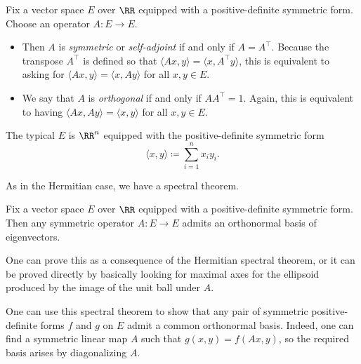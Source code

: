 \documentclass[../notes.tex]{subfiles}
\begin{document}
\begin{definition}[symmetric]
	Fix a vector space $E$ over $\RR$ equipped with a positive-definite symmetric form. Choose an operator $A\colon E\to E$.
	\begin{itemize}
		\item Then $A$ is \textit{symmetric} or \textit{self-adjoint} if and only if $A=A^\intercal$. Because the transpose $A^\intercal$ is defined so that $\langle Ax,y\rangle=\langle x,A^\intercal y\rangle$, this is equivalent to asking for $\langle Ax,y\rangle=\langle x,Ay\rangle$ for all $x,y\in E$.
		\item  We say that $A$ is \textit{orthogonal} if and only if $AA^\intercal=1$. Again, this is equivalent to having $\langle Ax,Ay\rangle=\langle x,y\rangle$ for all $x,y\in E$.
	\end{itemize}
\end{definition}
\begin{example}
	The typical $E$ is $\RR^n$ equipped with the positive-definite symmetric form
	\[\langle x,y\rangle\coloneqq\sum_{i=1}^nx_iy_i.\]
\end{example}
As in the Hermitian case, we have a spectral theorem.
\begin{theorem}
	Fix a vector space $E$ over $\RR$ equipped with a positive-definite symmetric form. Then any symmetric operator $A\colon E\to E$ admits an orthonormal basis of eigenvectors.
\end{theorem}
One can prove this as a consequence of the Hermitian spectral theorem, or it can be proved directly by basically looking for maximal axes for the ellipsoid produced by the image of the unit ball under $A$.
\begin{remark} \label{rem:simul-sym-basis}
	One can use this spectral theorem to show that any pair of symmetric positive-definite forms $f$ and $g$ on $E$ admit a common orthonormal basis. Indeed, one can find a symmetric linear map $A$ such that $g(x,y)=f(Ax,y)$, so the required basis arises by diagonalizing $A$.
\end{remark}
\end{document}
